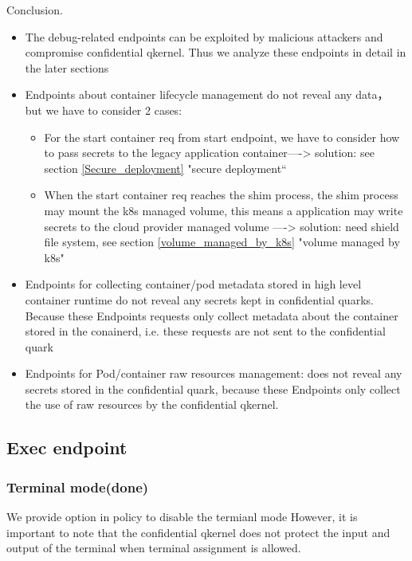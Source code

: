 Conclusion.
\begin{itemize}
    \item  The debug-related endpoints can be exploited by malicious attackers and compromise confidential qkernel. Thus we analyze these endpoints in detail in the later sections
    \item  Endpoints about container lifecycle management do not reveal any data， but we have to consider 2 cases:
    \begin{itemize}
        \item  For the start container req from start endpoint, we have to consider how to pass secrets to the legacy application container----> solution: see section \ref*{Secure_deployment} "secure deployment“
        \item  When the start container req reaches the shim process, the shim process may mount the k8s managed volume, this means a application may write secrets to the cloud provider managed volume ----> solution: need shield file system, see section \ref*{volume_managed_by_k8s} "volume managed by k8s"
    \end{itemize}
    \item Endpoints for collecting container/pod metadata stored in high level container runtime do not reveal any secrets kept in confidential quarks. Because these Endpoints requests only collect metadata about the container stored in the conainerd, i.e. these requests are not sent to the confidential quark
    \item  Endpoints for Pod/container raw resources management: does not reveal any secrets stored in the confidential quark, because these Endpoints only collect the use of raw resources by the confidential qkernel.
\end{itemize}


\subsection{Exec endpoint}
\subsubsection{Terminal mode(done)}
We provide option in policy to disable the termianl mode
However, it is important to note that the confidential qkernel does not protect the input and output of the terminal when terminal assignment is allowed. 

